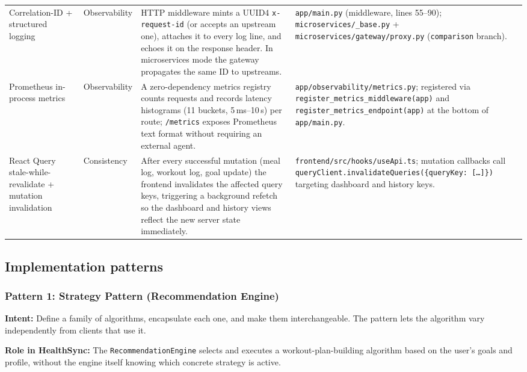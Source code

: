 \documentclass[11pt]{article}
\newcommand{\ProjectName}{HealthSync}
\begin{document}
\begin{longtable}{p{3.5cm} p{2.4cm} p{4.2cm} p{4.0cm}}
  Correlation-ID + structured logging
    & Observability
    & HTTP middleware mints a UUID4 \texttt{x-request-id} (or accepts an upstream one),
      attaches it to every log line, and echoes it on the response header. In microservices
      mode the gateway propagates the same ID to upstreams.
    & \texttt{app/main.py} (middleware, lines 55--90);
      \texttt{microservices/\_base.py} + \texttt{microservices/gateway/proxy.py}
      (\texttt{comparison} branch). \\[2pt]

  Prometheus in-process metrics
    & Observability
    & A zero-dependency metrics registry counts requests and records latency
      histograms (11 buckets, 5\,ms--10\,s) per route; \texttt{/metrics} exposes
      Prometheus text format without requiring an external agent.
    & \texttt{app/observability/metrics.py};
      registered via \texttt{register\_metrics\_middleware(app)} and
      \texttt{register\_metrics\_endpoint(app)} at the bottom of \texttt{app/main.py}. \\[2pt]

  React Query stale-while-revalidate + mutation invalidation
    & Consistency
    & After every successful mutation (meal log, workout log, goal update) the frontend
      invalidates the affected query keys, triggering a background refetch so the
      dashboard and history views reflect the new server state immediately.
    & \texttt{frontend/src/hooks/useApi.ts};
      mutation callbacks call \texttt{queryClient.invalidateQueries(\{queryKey: [\ldots]\})}
      targeting dashboard and history keys. \\

  \bottomrule
\end{longtable}

\subsection{Implementation patterns}

\subsubsection{Pattern 1: Strategy Pattern (Recommendation Engine)}

\textbf{Intent:} Define a family of algorithms, encapsulate each one, and make them
interchangeable. The pattern lets the algorithm vary independently from clients that use it.

\textbf{Role in \ProjectName:} The \texttt{RecommendationEngine} selects and executes a
workout-plan-building algorithm based on the user's goals and profile, without the
engine itself knowing which concrete strategy is active.
\end{document}

